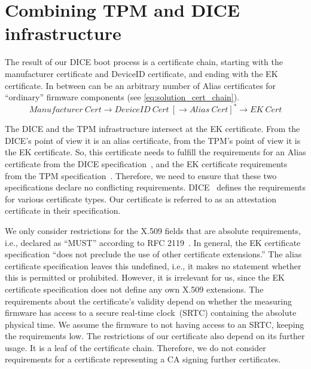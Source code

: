 



\section{Combining TPM and DICE infrastructure}

The result of our DICE boot process is a certificate chain, starting with the manufacturer certificate and DeviceID certificate, and ending with the EK certificate.
In between can be an arbitrary number of Alias certificates for ``ordinary'' firmware components (see \autoref{eq:solution_cert_chain}).
\begin{equation}
\label{eq:solution_cert_chain}
Manufacturer\ Cert \rightarrow DeviceID\ Cert\ [\rightarrow Alias\ Cert]^* \rightarrow EK\ Cert
\end{equation}


The DICE and the TPM infrastructure intersect at the \ac{EK} certificate.
From the DICE's point of view it is an alias certificate, from the TPM's point of view it is the \ac{EK} certificate.
So, this certificate needs to fulfill the requirements for an Alias certificate from the DICE specification~\cite{DICE_certs}, and the EK certificate requirements from the TPM specification~\cite{tcg-ek}.
Therefore, we need to ensure that these two specifications declare no conflicting requirements.
DICE~\cite{DICE_certs} defines the requirements for various certificate types.
Our certificate is referred to as an attestation certificate in their specification.

We only consider restrictions for the X.509 fields that are absolute requirements, i.e., declared as ``MUST'' according to RFC 2119~\cite{Bradner1997}.
In general, the EK certificate specification ``does not preclude the use of other certificate extensions.''
The alias certificate specification leaves this undefined, i.e., it makes no statement whether this is permitted or prohibited.
However, it is irrelevant for us, since the EK certificate specification does not define any own X.509 extensions.
The requirements about the certificate's validity depend on whether the measuring firmware has access to a secure real-time clock~(SRTC) containing the absolute physical time.
We assume the firmware to not having access to an SRTC, keeping the requirements low.
The restrictions of our certificate also depend on its further usage.
It is a leaf of the certificate chain.
Therefore, we do not consider requirements for a certificate representing a \ac{CA} signing further certificates.

